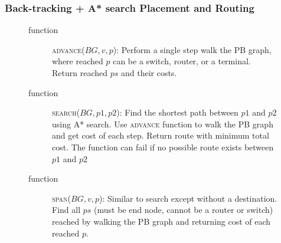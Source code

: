 \subsubsection{Back-tracking + A* search Placement and Routing}
\begin{figure}[!ht]
  \small
  \begin{description}
    \item [function] \textsc{advance}($BG,v,p$):
      Perform a single step walk the PB graph, where reached $p$ can be a switch, router, or a terminal.
      Return reached $ps$ and their costs.
    \item [function] \textsc{search}($BG,p1,p2$):
      Find the shortest path between $p1$ and $p2$ using A* search. Use \textsc{advance} function to walk
      the PB graph and get cost of each step. Return route with minimum total cost. The function can
      fail if no possible route exists between $p1$ and $p2$
    \item [function] \textsc{span}($BG,v,p$):
      Similar to search except without a destination. Find all $ps$ (must be end node, cannot be a router or switch) reached by 
      walking the PB graph and returning cost of each reached $p$.
  \end{description}


\end{figure}
